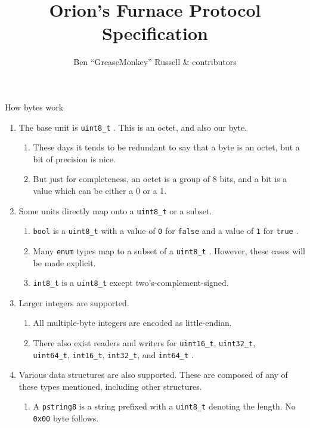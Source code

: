 \documentclass[a4paper,draft]{article}
\title{Orion's Furnace Protocol Specification}
\author{Ben ``GreaseMonkey'' Russell \& contributors}
\begin{document}
\setlength{\parskip}{0.5\baselineskip}
\maketitle

\tableofcontents
\clearpage

\begin{section}{How bytes work}
  \begin{enumerate}
    \item The base unit is \texttt{uint8\_t} . This is an octet, and also our byte.
    \begin{enumerate}
      \item These days it tends to be redundant to say that a byte is an octet, but a bit of precision is nice.
      \item But just for completeness, an octet is a group of 8 bits, and a bit is a value which can be either a 0 or a 1.
    \end{enumerate}

    \item Some units directly map onto a \texttt{uint8\_t} or a subset.
    \begin{enumerate}
      \item \texttt{bool} is a \texttt{uint8\_t} with a value of \texttt{0} for \texttt{false} and a value of \texttt{1} for \texttt{true} .
      \item Many \texttt{enum} types map to a subset of a \texttt{uint8\_t} . However, these cases will be made explicit.
      \item \texttt{int8\_t} is a \texttt{uint8\_t} except two's-complement-signed.
    \end{enumerate}

    \item Larger integers are supported.
    \begin{enumerate}
      \item All multiple-byte integers are encoded as little-endian.
      \item There also exist readers and writers for \texttt{uint16\_t}, \texttt{uint32\_t}, \\
        \texttt{uint64\_t}, \texttt{int16\_t}, \texttt{int32\_t}, and \texttt{int64\_t} .
    \end{enumerate}

    \item Various data structures are also supported. These are composed of any of these types mentioned, including other structures.
    \begin{enumerate}
      \item A \texttt{pstring8} is a string prefixed with a \texttt{uint8\_t} denoting the length. No \texttt{0x00} byte follows.
    \end{enumerate}


\end{enumerate}
\end{section}
\end{document}
